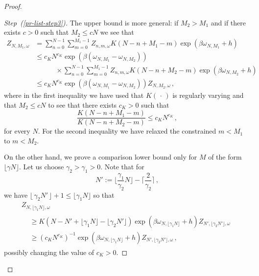 \documentclass[11pt]{article}
\theoremstyle{definition}
\numberwithin{equation}{section}
\numberwithin{figure}{section}
\numberwithin{table}{section}
\newenvironment{step}[1]{\begin{proof}[#1]}{\let\qed\relax\end{proof}}
\newcommand{\gb}{\beta}
\newcommand{\go}{\omega}
\begin{document}
\begin{proof}
\begin{step}{Step~(\ref{pr-list-step3})}
The upper bound is more general: if $M_2> M_1$ and if there exists $c>0$ such that $M_2 \le c N$ we see that
\begin{equation}\label{eq:comparison-upper}
\begin{split}
Z_{N, M_1, \go} & = \sum_{n=0}^{N-1} \sum_{m=0}^{M_1-1} Z_{n, m, \go} K(N-n+M_1-m) \exp\left(\gb \go_{N, M_1} +h\right)
\\
&\le c_K N^{c_K} \exp\left(\gb (\go_{N, M_1}-\go_{N, M_2}) \right)
\\ & \quad \qquad \times
\sum_{n=0}^{N-1} \sum_{m=0}^{M_1-1} Z_{n, m, \go} K(N-n+M_2-m) \exp\left(\gb \go_{N, M_2} +h\right)
\\ &\le c_K N^{c_K} \exp\left(\gb (\go_{N, M_1}-\go_{N, M_2}) \right) Z_{N, M_2, \go}\,,
\end{split}
\end{equation}
where in the first inequality we have used that $K({\,\cdot\,})$ is regularly varying and that $M_2 \le cN$ to see that there exists $c_K>0$ such that
\begin{equation}
\frac{K(N-n+M_1-m)}{K(N-n+M_2-m)} \le c_K N^{c_K}\,,
\end{equation}
for every $N$. For the second inequality we have relaxed the constrained $m< M_1$ to $m<M_2$.

On the other hand, we prove a comparison lower bound only for $M$ of the form $\lfloor \gamma N \rfloor$. Let us choose $\gamma_2>\gamma_1>0$. Note that for
\begin{equation}
N' := \Big \lfloor \frac{\gamma_1}{\gamma_2}N \Big \rfloor - \Big \lceil \frac{2}{\gamma_2} \Big \rceil\,,
\end{equation}
we have $\lfloor\,\gamma_2 N'\,\rfloor +1 \le \lfloor \gamma_1 N \rfloor $ so that
\begin{multline}\label{eq:comparison-lower}
Z_{N, \lfloor \gamma_1 N \rfloor, \go}\\
\begin{aligned}
&\ge K\left(N-N'+ \lfloor \gamma_1 N \rfloor -\lfloor \gamma_2 N' \rfloor\right)
\exp\left(\gb\go_{N, \lfloor \gamma_1 N \rfloor }+h\right) Z_{N', \lfloor \gamma_2 N' \rfloor, \go}
\\
&\ge \left(c_K N^{c_K}\right)^{-1} \exp\left(\gb\go_{N, \lfloor \gamma_1 N \rfloor }+h\right) Z_{N', \lfloor \gamma_2 N' \rfloor, \go}\,,
\end{aligned}
\end{multline}
possibly changing the value of $c_K>0$.


\end{step}
\end{proof}
\end{document}
